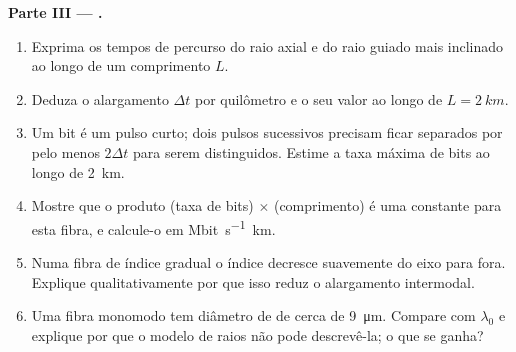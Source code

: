 \begin{problem}
\medskip
\noindent\textbf{Parte III --- .}
\begin{enumerate}[resume]
  \item Exprima os tempos de percurso do raio axial e do raio guiado
        mais inclinado ao longo de um comprimento $L$.
  \item Deduza o alargamento $\Delta t$ por quilômetro e o seu valor ao longo de
        $L = \qty{2}{km}$.
  \item Um bit é um pulso curto; dois pulsos sucessivos precisam ficar
        separados por pelo menos $2\Delta t$ para serem distinguidos. Estime a
        taxa máxima de bits ao longo de \qty{2}{km}.
  \item Mostre que o produto (taxa de bits) $\times$ (comprimento) é uma
        constante para esta fibra, e calcule-o em \unit{Mbit.s^{-1}.km}.
  \item Numa fibra de índice gradual o índice decresce suavemente do
        eixo para fora. Explique qualitativamente por que isso reduz o
        alargamento intermodal.
  \item Uma fibra monomodo tem diâmetro de  de cerca de \qty{9}{\micro m}.
        Compare com $\lambda_0$ e explique por que o modelo de raios não pode
        descrevê-la; o que se ganha?
\end{enumerate}


\end{problem}
